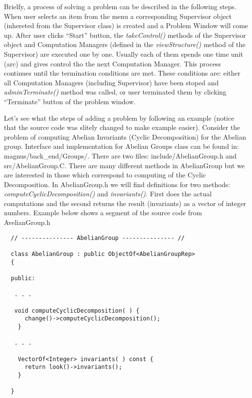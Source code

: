 \documentclass[12pt]{article}
\begin{document}
  Brielfy, a process of solving a problem can be described in the 
  following steps. When user selects an item from the menu a corresponding
  Supervisor object (inhereted from the Supervisor class) is created and
  a Problem Window will come up.
  After user clicks ``Start'' button, the \emph{takeControl()} methods of the 
  Supervisor
  object and Computation Managers (defined in the \emph{viewStructure()} method of
  the Supervisor) are  executed one by one. Usually each of them spends one time
  unit (arc) and gives control tho the next Computation Manager. This process 
  continues until the termination conditions are met. These  conditions are:
  either all Computation Managers (including Supervisor) have been stoped and 
  \emph{adminTerminate()} method was called, or user terminated them by clicking
  ``Terminate'' button of the problem window.  


  Let's see what the steps of adding a problem  by following an example (notice 
  that
  the source code was slitely changed to make example easier).
  Consider the problem of computing Abelian Invariants (Cyclic Decomposition) for 
  the
   Abelian group.  Interface and implementation for  Abelian Groups class can be 
  found in:
  magnus/back\_end/Groups/. There are two files: include/AbelianGroup.h and 
   src/AbelianGroup.C.  There are many different methods  in AbelianGroup but we 
  are
   interested in those  which correspond to computing of the Cyclic Decomposition. 
  In AbelianGroup.h we will find definitions for   two methods:   
  \emph{computeCyclicDecomposition()} and  \emph{invariants()}.
  First does the actual computations and the second returns the result 
  (invariants) as a
   vector of integer numbers.  
  Example below shows  a segment of the source code from AvelianGroup.h

  \footnotesize
  \begin{verbatim}
  // --------------- AbelianGroup --------------- //

  class AbelianGroup : public ObjectOf<AbelianGroupRep>
  {

  public:

   . . .

   void computeCyclicDecomposition( ) {
      change()->computeCyclicDecomposition();
    }

   . . . 
   
    VectorOf<Integer> invariants( ) const {
      return look()->invariants();
    }

  }
  \end{verbatim}
  \normalsize
\end{document}
